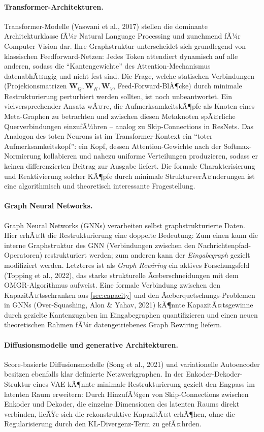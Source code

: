 ﻿\documentclass[12pt, a4paper, openany]{report}
\begin{document}
\paragraph{Transformer-Architekturen.}
Transformer-Modelle (Vaswani et al., 2017) stellen die dominante
Architekturklasse fÃ¼r Natural Language Processing und zunehmend fÃ¼r
Computer Vision dar.  Ihre Graphstruktur unterscheidet sich grundlegend
von klassischen Feedforward-Netzen: Jedes Token attendiert dynamisch
auf alle anderen, sodass die ``Kantengewichte'' des Attention-Mechanismus
datenabhÃ¤ngig und nicht fest sind.  Die Frage, welche statischen
Verbindungen (Projekionsmatrizen $\bm{W}_Q, \bm{W}_K, \bm{W}_V$,
Feed-Forward-BlÃ¶cke) durch minimale Restrukturierung perturbiert werden
sollten, ist noch unbeantwortet.  Ein vielversprechender Ansatz wÃ¤re,
die AufmerksamkeitskÃ¶pfe als Knoten eines Meta-Graphen zu betrachten und
zwischen diesen Metaknoten spÃ¤rliche Querverbindungen einzufÃ¼hren --
analog zu Skip-Connections in ResNets.  Das Analogon des toten Neurons
ist im Transformer-Kontext ein ``toter Aufmerksamkeitskopf'': ein Kopf,
dessen Attention-Gewichte nach der Softmax-Normierung kollabieren und
nahezu uniforme Verteilungen produzieren, sodass er keinen
differenzierten Beitrag zur Ausgabe liefert.  Die formale
Charakterisierung und Reaktivierung solcher KÃ¶pfe durch minimale
StrukturverÃ¤nderungen ist eine algorithmisch und theoretisch
interessante Fragestellung.

\paragraph{Graph Neural Networks.}
Graph Neural Networks (GNNs) verarbeiten selbst graphstrukturierte Daten.
Hier erhÃ¤lt die Restrukturierung eine doppelte Bedeutung: Zum einen kann
die interne Graphstruktur des GNN (Verbindungen zwischen den
Nachrichtenpfad-Operatoren) restrukturiert werden; zum anderen kann der
\emph{Eingabegraph} gezielt modifiziert werden.  Letzteres ist als
\emph{Graph Rewiring} ein aktives Forschungsfeld (Topping et al., 2022),
das starke strukturelle Ãœberschneidungen mit dem OMGR-Algorithmus
aufweist.  Eine formale Verbindung zwischen den KapazitÃ¤tsschranken aus
\cref{sec:capacity} und den Ãœberquetschungs-Problemen in GNNs (Over-Squashing,
Alon \& Yahav, 2021) kÃ¶nnte KapazitÃ¤tsgewinne durch gezielte Kantenzugaben
im Eingabegraphen quantifizieren und einen neuen theoretischen Rahmen fÃ¼r
datengetriebenes Graph Rewiring liefern.

\paragraph{Diffusionsmodelle und generative Architekturen.}
Score-basierte Diffusionsmodelle (Song et al., 2021) und variationelle
Autoencoder besitzen ebenfalls klar definierte Netzwerkgraphen.  In der
Enkoder-Dekoder-Struktur eines VAE kÃ¶nnte minimale Restrukturierung
gezielt den Engpass im latenten Raum erweitern: Durch HinzufÃ¼gen von
Skip-Connections zwischen Enkoder und Dekoder, die einzelne
Dimensionen des latenten Raums direkt verbinden, lieÃŸe sich die
rekonstruktive KapazitÃ¤t erhÃ¶hen, ohne die Regularisierung durch den
KL-Divergenz-Term zu gefÃ¤hrden.
\end{document}
